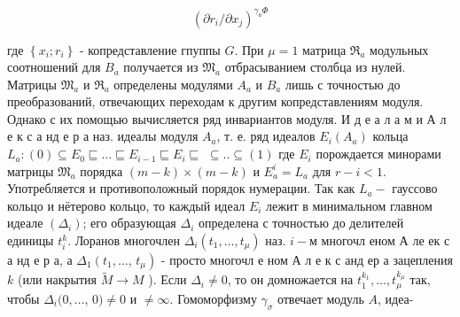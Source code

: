 \documentclass[10pt]{article}
\begin{document}
\[

\left(\partial r_{i} / \partial x_{j}\right)^{\gamma_{a} \Phi}

\]



где $\left\{x_{i} ; r_{i}\right\}$ - копредставление гпуппы $G$. При $\mu=1$ матрица $\mathfrak{R}_{a}$ модульных соотношений для $B_{a}$ получается из $\mathfrak{M}_{a}$ отбрасыванием столбца из нулей. Матрицы $\mathfrak{M}_{a}$ и $\mathfrak{R}_{a}$ определены модулями $A_{a}$ и $B_{a}$ лишь с точностью до преобразований, отвечающих переходам к другим копредставлениям модуля. Однако с их помощью вычисляется ряд инвариантов модуля. И д е а л а м и А л е к с а нд е р а наз. идеалы модуля $A_{a}$, т. е. ряд идеалов $E_{i}\left(A_{a}\right)$ кольца $L_{a}:(0) \subseteq E_{0} \sqsubseteq \ldots \sqsubseteq E_{i-1} \sqsubseteq E_{i} \sqsubseteq$ $\subseteq . . \subseteq(1)$ где $E_{i}$ порождается минорами матрицы $\mathfrak{M}_{a}$ порядка $(m-k) \times(m-k)$ и $E_{a}^{i}=L_{a}$ для $r-i<1$. Употребляется и противоположный порядок нумерации. Так как $L_{a}-$ гауссово кольцо и нётерово кольцо, то каждый идеал $E_{i}$ лежит в минимальном главном идеале $\left(\Delta_{i}\right)$; его образующая $\Delta_{i}$ определена с точностью до делителей единицы $t_{i}^{k}$. Лоранов многочлен $\Delta_{i}\left(t_{1}, \ldots, t_{\mu}\right)$ наз. $i-\mathbf{м}$ многочл еном А ле ек с а нд е р а, а $\Delta_{1}\left(t_{1}, \ldots\right.$, $\left.t_{\mu}\right)$ - просто многочл е ном А л е к с анд ер а зацепления $k$ (или накрытия $\tilde{M} \rightarrow M$ ). Если $\Delta_{i} \neq 0$, то он домножается на $t_{1}^{k_{1}}, \ldots, t_{\mu}^{k_{\mu}}$ так, чтобы $\Delta_{i}(0, \ldots$, $0) \neq 0$ и $\neq \infty$. Гомоморфизму $\gamma_{\sigma}$ отвечает модуль $A$, идеа-
\end{document}
